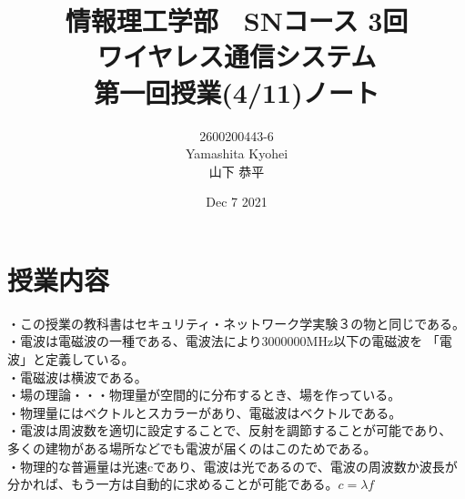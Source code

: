 \documentclass[dvipdfmx,autodetect-engine,titlepage]{jsarticle}
\title{情報理工学部　SNコース 3回\\
ワイヤレス通信システム\\
第一回授業(4/11)ノート}
\author{2600200443-6\\Yamashita Kyohei\\山下 恭平}
\date{Dec 7 2021}
\begin{document}
\maketitle

\section{授業内容}
・この授業の教科書はセキュリティ・ネットワーク学実験３の物と同じである。\\

・電波は電磁波の一種である、電波法により3000000MHz以下の電磁波を
「電波」と定義している。\\

・電磁波は横波である。\\

・場の理論・・・物理量が空間的に分布するとき、場を作っている。\\

・物理量にはベクトルとスカラーがあり、電磁波はベクトルである。\\

・電波は周波数を適切に設定することで、反射を調節することが可能であり、
多くの建物がある場所などでも電波が届くのはこのためである。\\

・物理的な普遍量は光速cであり、電波は光であるので、電波の周波数か波長が
分かれば、もう一方は自動的に求めることが可能である。\begin{math}
  c = \lambda f
\end{math}\\
\end{document}
